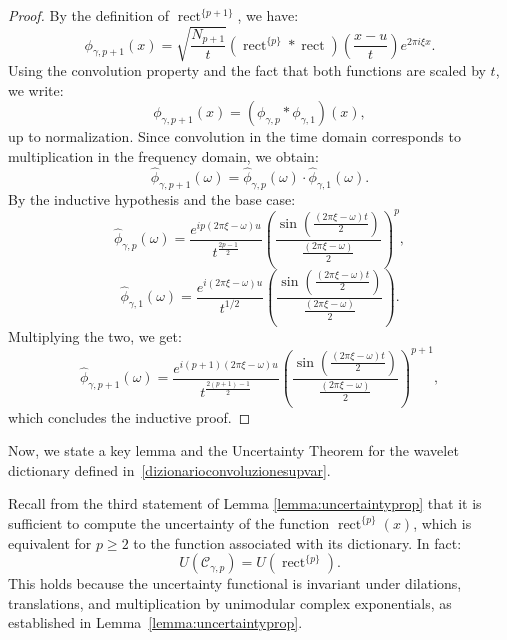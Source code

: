 \documentclass[preprint,hidelinks,authoryear]{elsarticle}
\theoremstyle{plain}
\theoremstyle{definition}
\theoremstyle{remark}
\begin{document}
\begin{proof}
By the definition of $ \operatorname{rect}^{\{p+1\}} $, we have:
$$
\phi_{\gamma,p+1}(x) = \sqrt{\frac{N_{p+1}}{t}} \left( \operatorname{rect}^{\{p\}} * \operatorname{rect} \right)\left( \frac{x - u}{t} \right) e^{2\pi i \xi x}.
$$
Using the convolution property and the fact that both functions are scaled by $ t $, we write:
$$
\phi_{\gamma,p+1}(x) = \left( \phi_{\gamma,p} * \phi_{\gamma,1} \right)(x),
$$
up to normalization. Since convolution in the time domain corresponds to multiplication in the frequency domain, we obtain:
$$
\hat{\phi}_{\gamma,p+1}(\omega) = \hat{\phi}_{\gamma,p}(\omega) \cdot \hat{\phi}_{\gamma,1}(\omega).
$$
By the inductive hypothesis and the base case:
$$
\hat{\phi}_{\gamma,p}(\omega) = \frac{e^{i p (2\pi \xi - \omega) u}}{t^{\frac{2p - 1}{2}}} \left( \frac{\sin\left( \frac{(2\pi \xi - \omega)t}{2} \right)}{ \frac{(2\pi \xi - \omega)}{2} } \right)^p,
$$
$$
\hat{\phi}_{\gamma,1}(\omega) = \frac{e^{i (2\pi \xi - \omega) u}}{t^{1/2}} \left( \frac{\sin\left( \frac{(2\pi \xi - \omega)t}{2} \right)}{ \frac{(2\pi \xi - \omega)}{2} } \right).
$$
Multiplying the two, we get:
$$
\hat{\phi}_{\gamma,p+1}(\omega) = \frac{e^{i(p+1)(2\pi \xi - \omega) u}}{t^{\frac{2(p+1) - 1}{2}}} \left( \frac{\sin\left( \frac{(2\pi \xi - \omega)t}{2} \right)}{ \frac{(2\pi \xi - \omega)}{2} } \right)^{p+1},
$$
which concludes the inductive proof.

\end{proof}

Now, we state a key lemma and the Uncertainty Theorem for the wavelet dictionary defined in~\eqref{dizionarioconvoluzionesupvar}.







Recall from the third statement of Lemma \ref{lemma:uncertaintyprop} that it is sufficient to compute the uncertainty of the function $\operatorname{rect}^{\{p\}}(x)$, which is equivalent for $p \ge 2$ to the function associated with its dictionary. In fact:
\begin{equation}
    U(\mathcal{C}_{\gamma,p})=U(\operatorname{rect}^{\{p\}}).
\end{equation}
This holds because the uncertainty functional is invariant under dilations, translations, and multiplication by unimodular complex exponentials, as established in Lemma~\ref{lemma:uncertaintyprop}.
\end{document}

